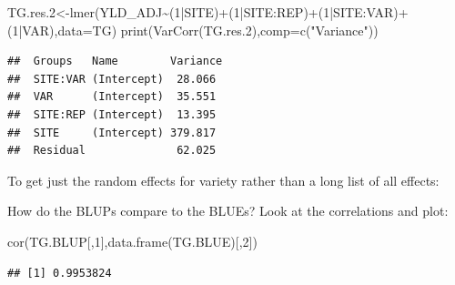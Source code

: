 \documentclass[
]{book}
\newenvironment{Shaded}{\begin{snugshade}}{\end{snugshade}}
\newcommand{\AttributeTok}[1]{\textcolor[rgb]{0.77,0.63,0.00}{#1}}
\newcommand{\DecValTok}[1]{\textcolor[rgb]{0.00,0.00,0.81}{#1}}
\newcommand{\FloatTok}[1]{\textcolor[rgb]{0.00,0.00,0.81}{#1}}
\newcommand{\FunctionTok}[1]{\textcolor[rgb]{0.00,0.00,0.00}{#1}}
\newcommand{\NormalTok}[1]{#1}
\newcommand{\OtherTok}[1]{\textcolor[rgb]{0.56,0.35,0.01}{#1}}
\newcommand{\SpecialCharTok}[1]{\textcolor[rgb]{0.00,0.00,0.00}{#1}}
\newcommand{\StringTok}[1]{\textcolor[rgb]{0.31,0.60,0.02}{#1}}
\begin{document}
\begin{Shaded}
\begin{Highlighting}[]
\NormalTok{TG.res}\FloatTok{.2}\OtherTok{\textless{}{-}}\FunctionTok{lmer}\NormalTok{(YLD\_ADJ}\SpecialCharTok{\textasciitilde{}}\NormalTok{(}\DecValTok{1}\SpecialCharTok{|}\NormalTok{SITE)}\SpecialCharTok{+}\NormalTok{(}\DecValTok{1}\SpecialCharTok{|}\NormalTok{SITE}\SpecialCharTok{:}\NormalTok{REP)}\SpecialCharTok{+}\NormalTok{(}\DecValTok{1}\SpecialCharTok{|}\NormalTok{SITE}\SpecialCharTok{:}\NormalTok{VAR)}\SpecialCharTok{+}\NormalTok{(}\DecValTok{1}\SpecialCharTok{|}\NormalTok{VAR),}\AttributeTok{data=}\NormalTok{TG)}
\FunctionTok{print}\NormalTok{(}\FunctionTok{VarCorr}\NormalTok{(TG.res}\FloatTok{.2}\NormalTok{),}\AttributeTok{comp=}\FunctionTok{c}\NormalTok{(}\StringTok{"Variance"}\NormalTok{))}
\end{Highlighting}
\end{Shaded}

\begin{verbatim}
##  Groups   Name        Variance
##  SITE:VAR (Intercept)  28.066 
##  VAR      (Intercept)  35.551 
##  SITE:REP (Intercept)  13.395 
##  SITE     (Intercept) 379.817 
##  Residual              62.025
\end{verbatim}

To get just the random effects for variety rather than a long list of all effects:

\begin{Shaded}
\end{Shaded}

How do the BLUPs compare to the BLUEs? Look at the correlations and plot:

\begin{Shaded}
\begin{Highlighting}[]
\FunctionTok{cor}\NormalTok{(TG.BLUP[,}\DecValTok{1}\NormalTok{],}\FunctionTok{data.frame}\NormalTok{(TG.BLUE)[,}\DecValTok{2}\NormalTok{])}
\end{Highlighting}
\end{Shaded}

\begin{verbatim}
## [1] 0.9953824
\end{verbatim}
\end{document}
